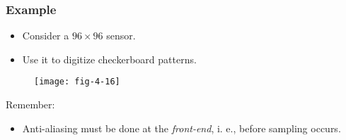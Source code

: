 
\begin{frame}
\frametitle{Example}
\begin{itemize}
\item Consider a $96\times 96$ sensor.
\item Use it to digitize checkerboard patterns.
\end{itemize}
\begin{figure}
\centering
\texttt{[image: fig-4-16]}
\end{figure}
\end{frame}


\begin{frame}
Remember:
\begin{itemize}
\item Anti-aliasing must be done at the \textit{front-end}, i. e., before sampling occurs.
\end{itemize}
\end{frame}

%
%
%


